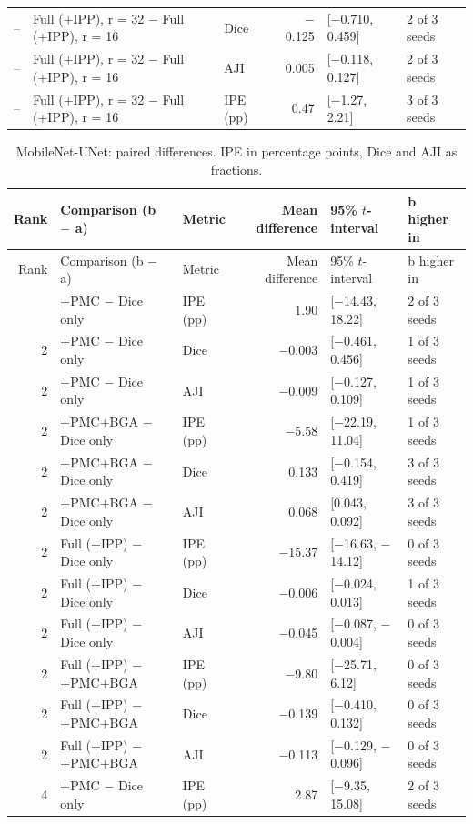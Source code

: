 \documentclass[10pt]{article}
\begin{document}
\begin{landscape}
{\begin{longtable}{r l l r l l}
-- & Full (+IPP), r = 32 $-$ Full (+IPP), r = 16 & Dice & $-$0.125 & [$-$0.710, 0.459] & 2 of 3 seeds \\
-- & Full (+IPP), r = 32 $-$ Full (+IPP), r = 16 & AJI & 0.005 & [$-$0.118, 0.127] & 2 of 3 seeds \\
-- & Full (+IPP), r = 32 $-$ Full (+IPP), r = 16 & IPE (pp) & 0.47 & [$-$1.27, 2.21] & 3 of 3 seeds \\
\end{longtable}
}
{\footnotesize
\begin{longtable}{r l l r l l}
\caption{MobileNet-UNet: paired differences. IPE in percentage points, Dice and AJI as fractions.}\label{tab:pair_mobilenet_unet}\\
\toprule
Rank & Comparison (b $-$ a) & Metric & Mean difference & 95\% $t$-interval & b higher in \\
\midrule
\endfirsthead
\toprule
Rank & Comparison (b $-$ a) & Metric & Mean difference & 95\% $t$-interval & b higher in \\
\midrule
\endhead
\bottomrule
\endfoot
2 & +PMC $-$ Dice only & IPE (pp) & 1.90 & [$-$14.43, 18.22] & 2 of 3 seeds \\
2 & +PMC $-$ Dice only & Dice & $-$0.003 & [$-$0.461, 0.456] & 1 of 3 seeds \\
2 & +PMC $-$ Dice only & AJI & $-$0.009 & [$-$0.127, 0.109] & 1 of 3 seeds \\
2 & +PMC+BGA $-$ Dice only & IPE (pp) & $-$5.58 & [$-$22.19, 11.04] & 1 of 3 seeds \\
2 & +PMC+BGA $-$ Dice only & Dice & 0.133 & [$-$0.154, 0.419] & 3 of 3 seeds \\
2 & +PMC+BGA $-$ Dice only & AJI & 0.068 & [0.043, 0.092] & 3 of 3 seeds \\
2 & Full (+IPP) $-$ Dice only & IPE (pp) & $-$15.37 & [$-$16.63, $-$14.12] & 0 of 3 seeds \\
2 & Full (+IPP) $-$ Dice only & Dice & $-$0.006 & [$-$0.024, 0.013] & 1 of 3 seeds \\
2 & Full (+IPP) $-$ Dice only & AJI & $-$0.045 & [$-$0.087, $-$0.004] & 0 of 3 seeds \\
2 & Full (+IPP) $-$ +PMC+BGA & IPE (pp) & $-$9.80 & [$-$25.71, 6.12] & 0 of 3 seeds \\
2 & Full (+IPP) $-$ +PMC+BGA & Dice & $-$0.139 & [$-$0.410, 0.132] & 0 of 3 seeds \\
2 & Full (+IPP) $-$ +PMC+BGA & AJI & $-$0.113 & [$-$0.129, $-$0.096] & 0 of 3 seeds \\
4 & +PMC $-$ Dice only & IPE (pp) & 2.87 & [$-$9.35, 15.08] & 2 of 3 seeds \\

\end{longtable}}
\end{landscape}
\end{document}
